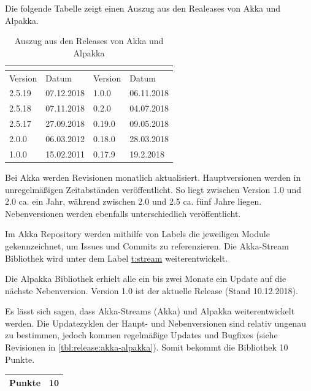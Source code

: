 Die folgende Tabelle zeigt einen Auszug aus den Realeases von Akka und Alpakka.

\begin{table}[H]
\centering
\caption{Auszug aus den Releases von Akka und Alpakka}
\label{tbl:release:akka-alpakka}
\begin{tabular}{|l|l|l|l|}
\hline
\rowcolor[HTML]{00A99D} 
\multicolumn{2}{|l|}{\cellcolor[HTML]{00A99D}{\color[HTML]{FFFFFF} Akka}} & \multicolumn{2}{l|}{\cellcolor[HTML]{00A99D}{\color[HTML]{FFFFFF} Alpakka}} \\ \hline
\rowcolor[HTML]{00A99D} 
{\color[HTML]{FFFFFF} Version} & {\color[HTML]{FFFFFF} Datum} & {\color[HTML]{FFFFFF} Version} & {\color[HTML]{FFFFFF} Datum} \\ \hline
2.5.19 & 07.12.2018 & 1.0.0 & 06.11.2018 \\ \hline
2.5.18 & 07.11.2018 & 0.2.0 & 04.07.2018 \\ \hline
2.5.17 & 27.09.2018 & 0.19.0 & 09.05.2018 \\ \hline
2.0.0 & 06.03.2012 & 0.18.0 & 28.03.2018 \\ \hline
1.0.0 & 15.02.2011 & 0.17.9 & 19.2.2018 \\ \hline
\end{tabular}
\end{table}


Bei Akka werden Revisionen monatlich aktualisiert. Hauptversionen werden in unregelmäßigen Zeitabständen veröffentlicht. So liegt zwischen Version 1.0 und 2.0 ca. ein Jahr, während zwischen 2.0 und 2.5 ca. fünf Jahre liegen. Nebenversionen werden ebenfalls unterschiedlich veröffentlicht. 

Im Akka Repository werden mithilfe von Labels die jeweiligen Module gekennzeichnet, um Issues und Commits zu referenzieren. Die Akka-Stream Bibliothek wird unter dem Label \href{https://github.com/akka/akka/labels/t\%3Astream}{t:stream} weiterentwickelt. 

Die Alpakka Bibliothek erhielt alle ein bis zwei Monate ein Update auf die nächste Nebenversion. Version 1.0 ist der aktuelle Release (Stand 10.12.2018). 

Es lässt sich sagen, dass Akka-Streams (Akka) und Alpakka weiterentwickelt werden. Die Updatezyklen der Haupt- und Nebenversionen sind relativ ungenau zu bestimmen, jedoch kommen regelmäßige Updates und Bugfixes (siehe Revisionen in \autoref{tbl:release:akka-alpakka}). Somit bekommt die Bibliothek 10 Punkte.

\begin{table}[H]
\begin{tabular}{|
>{\columncolor[HTML]{00A99D}}l |l|}
\hline
Punkte & 10 \\ \hline
\end{tabular}
\end{table}

